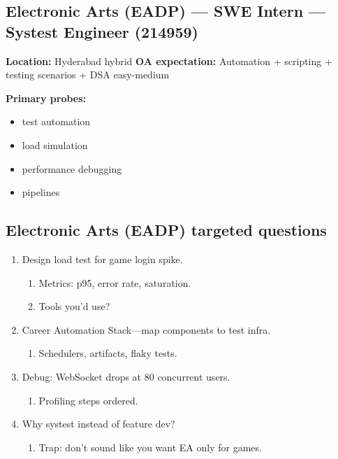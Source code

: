 \documentclass[9pt,a4paper]{article}
\begin{document}
\subsection{Electronic Arts (EADP) --- SWE Intern --- Systest Engineer (214959)}
\textbf{Location:} Hyderabad hybrid \quad \textbf{OA expectation:} Automation + scripting + testing scenarios + DSA easy-medium

\textbf{Primary probes:}
\begin{itemize}
  \item test automation
  \item load simulation
  \item performance debugging
  \item pipelines
\end{itemize}

\subsection{Electronic Arts (EADP) targeted questions}
\begin{enumerate}[label=\textbf{Q\arabic*:}, leftmargin=*]
  \item Design load test for game login spike.
  \begin{enumerate}[label=\textit{FU\arabic*:}, leftmargin=2em]
    \item Metrics: p95, error rate, saturation.
    \item Tools you'd use?
  \end{enumerate}
  \item Career Automation Stack---map components to test infra.
  \begin{enumerate}[label=\textit{FU\arabic*:}, leftmargin=2em]
    \item Schedulers, artifacts, flaky tests.
  \end{enumerate}
  \item Debug: WebSocket drops at 80 concurrent users.
  \begin{enumerate}[label=\textit{FU\arabic*:}, leftmargin=2em]
    \item Profiling steps ordered.
  \end{enumerate}
  \item Why systest instead of feature dev?
  \begin{enumerate}[label=\textit{FU\arabic*:}, leftmargin=2em]
    \item Trap: don't sound like you want EA only for games.
  \end{enumerate}
\end{enumerate}
\end{document}
